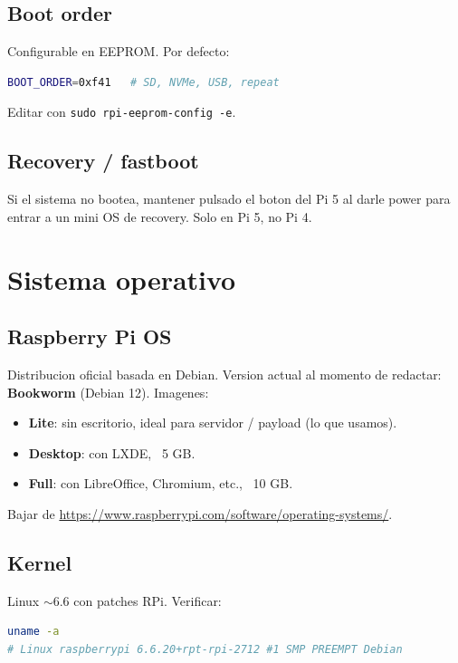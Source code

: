 \documentclass[11pt,a4paper,oneside]{report}
\begin{document}
\section{Boot order}

Configurable en EEPROM. Por defecto:
\begin{lstlisting}[language=bash]
BOOT_ORDER=0xf41   # SD, NVMe, USB, repeat
\end{lstlisting}

Editar con \texttt{sudo rpi-eeprom-config -e}.

\section{Recovery / fastboot}

Si el sistema no bootea, mantener pulsado el boton del Pi 5 al darle power
para entrar a un mini OS de recovery. Solo en Pi 5, no Pi 4.

\chapter{Sistema operativo}

\section{Raspberry Pi OS}

Distribucion oficial basada en Debian. Version actual al momento de redactar:
\textbf{Bookworm} (Debian 12). Imagenes:

\begin{itemize}[leftmargin=2em]
  \item \textbf{Lite}: sin escritorio, ideal para servidor / payload (lo que usamos).
  \item \textbf{Desktop}: con LXDE, ~5 GB.
  \item \textbf{Full}: con LibreOffice, Chromium, etc., ~10 GB.
\end{itemize}

Bajar de \url{https://www.raspberrypi.com/software/operating-systems/}.

\section{Kernel}

Linux $\sim 6.6$ con patches RPi. Verificar:

\begin{lstlisting}[language=bash]
uname -a
# Linux raspberrypi 6.6.20+rpt-rpi-2712 #1 SMP PREEMPT Debian
\end{lstlisting}
\end{document}
